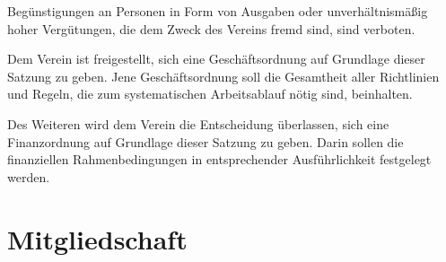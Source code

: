 \documentclass[%
    parskip=half,
]{scrartcl}
\begin{document}
\begin{contract}
		Begünstigungen an Personen in Form von Ausgaben oder unverhältnismäßig hoher Vergütungen, die dem Zweck des Vereins fremd sind, sind verboten.
		
		
		Dem Verein ist freigestellt, sich eine Geschäftsordnung auf Grundlage dieser Satzung zu geben. Jene Geschäftsordnung soll die Gesamtheit aller Richtlinien und Regeln, die zum systematischen Arbeitsablauf nötig sind, beinhalten.
		
		Des Weiteren wird dem Verein die Entscheidung überlassen, sich eine Finanzordnung auf Grundlage dieser Satzung zu geben. Darin sollen die finanziellen Rahmenbedingungen in entsprechender Ausführlichkeit festgelegt werden.
	
	\end{contract}
	
	\section{Mitgliedschaft}
	
\end{document}
